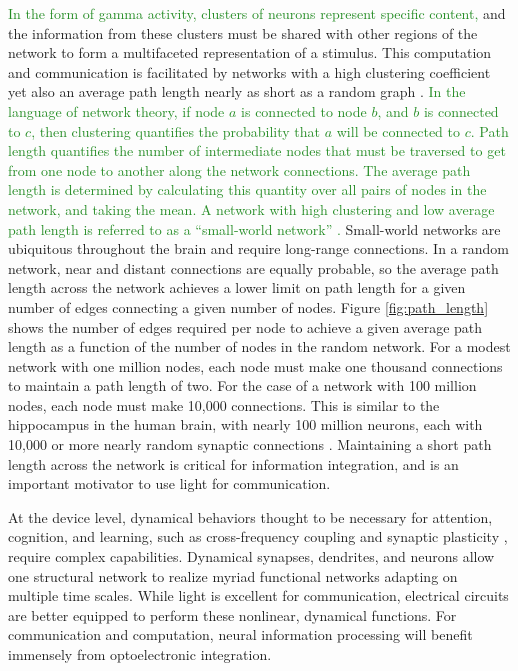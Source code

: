 \documentclass[twocolumn]{article}
\begin{document}
\textcolor{ForestGreen}{In the form of gamma activity, clusters of neurons represent specific content,} and the information from these clusters must be shared with other regions of the network to form a multifaceted representation of a stimulus. This computation and communication is facilitated by networks with a high clustering coefficient yet also an average path length nearly as short as a random graph \cite{eskn2015}. \textcolor{ForestGreen}{In the language of network theory, if node $a$ is connected to node $b$, and $b$ is connected to $c$, then clustering quantifies the probability that $a$ will be connected to $c$. Path length quantifies the number of intermediate nodes that must be traversed to get from one node to another along the network connections. The average path length is determined by calculating this quantity over all pairs of nodes in the network, and taking the mean. A network with high clustering and low average path length is referred to as a ``small-world network'' \cite{wast1998}.} Small-world networks are ubiquitous throughout the brain \cite{sp2010} and require long-range connections. In a random network, near and distant connections are equally probable, so the average path length across the network achieves a lower limit on path length for a given number of edges connecting a given number of nodes. Figure \ref{fig:path_length} shows the number of edges required per node to achieve a given average path length as a function of the number of nodes in the random network. For a modest network with one million nodes, each node must make one thousand connections to maintain a path length of two. For the case of a network with 100 million nodes, each node must make 10,000 connections. This is similar to the hippocampus in the human brain, with nearly 100 million neurons, each with 10,000 or more nearly random synaptic connections \cite{bu2006}. Maintaining a short path length across the network is critical for information integration, and is an important motivator to use light for communication.

At the device level, dynamical behaviors thought to be necessary for attention, cognition, and learning, such as cross-frequency coupling \cite{bu2006} and synaptic plasticity \cite{mage2012,ab2008,fudr2005}, require complex capabilities. Dynamical synapses, dendrites, and neurons allow one structural network to realize myriad functional networks adapting on multiple time scales. While light is excellent for communication, electrical circuits are better equipped to perform these nonlinear, dynamical functions. For communication and computation, neural information processing will benefit immensely from optoelectronic integration.
\end{document}
